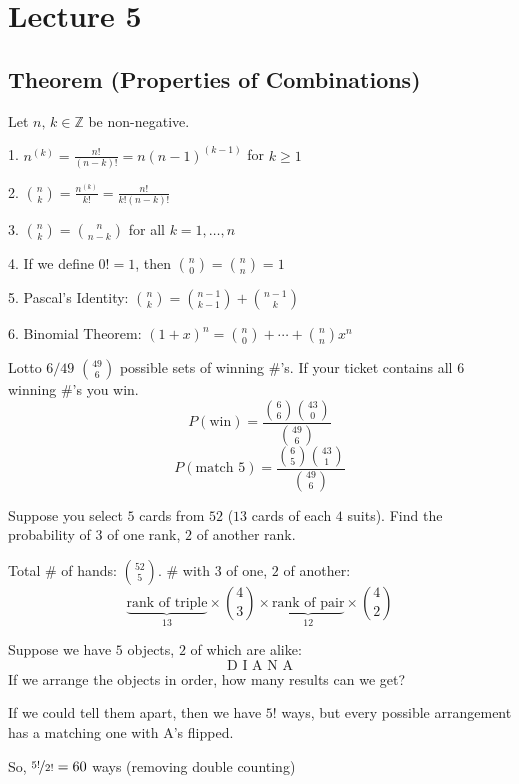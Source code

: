 \section{Lecture 5}
\begin{thmbox}
    \subsection{Theorem (Properties of Combinations)}
    Let $ n,\,k\in \mathbb{Z} $ be non-negative.
    
    1. $ n^{(k)}=\frac{n!}{(n-k)!}=n(n-1)^{(k-1)} $ for $ k\ge 1 $

    2. $ \binom{n}{k}=\frac{n^{(k)}}{k!}=\frac{n!}{k!(n-k)!} $

    3. $\binom{n}{k}=\binom{n}{n-k}$ for all $ k=1,\ldots,n $

    4. If we define $ 0!=1 $, then $\binom{n}{0}=\binom{n}{n}=1$

    5. Pascal's Identity: $\binom{n}{k}=\binom{n-1}{k-1}+\binom{n-1}{k}$

    6. Binomial Theorem: $ (1+x)^n=\binom{n}{0}+\cdots +\binom{n}{n}x^n $
\end{thmbox}


Lotto $ 6/49 $ $ \binom{49}{6} $ possible sets of winning \#'s. If your
ticket contains all $ 6 $ winning \#'s you win.
\[ P(\text{win})=\frac{\binom{6}{6}\binom{43}{0}}{\binom{49}{6}} \]
\[ P(\text{match }5)=\frac{\binom{6}{5}\binom{43}{1}}{\binom{49}{6}} \]


Suppose you select $ 5 $ cards from $ 52 $ ($ 13 $ cards of each $ 4 $ suits).
Find the probability of $ 3 $ of one rank, $ 2 $ of another rank.

Total \# of hands: $ \binom{52}{5} $.
\# with $ 3 $ of one, $2$ of another:
\[ \underbrace{\text{rank of triple}}_{13}\times \binom{4}{3}\times
\underbrace{\text{rank of pair}}_{12}\times \binom{4}{2} \]


Suppose we have $ 5 $ objects, $ 2 $ of which are alike:
\[ \text{D I A N A} \]
If we arrange the objects in order, how many results can we get?

If we could tell them apart, then we have $ 5! $ ways,
but every possible arrangement has a matching one with A's flipped.

So, $ \nicefrac{5!}{2!} =60 $ ways (removing double counting)

